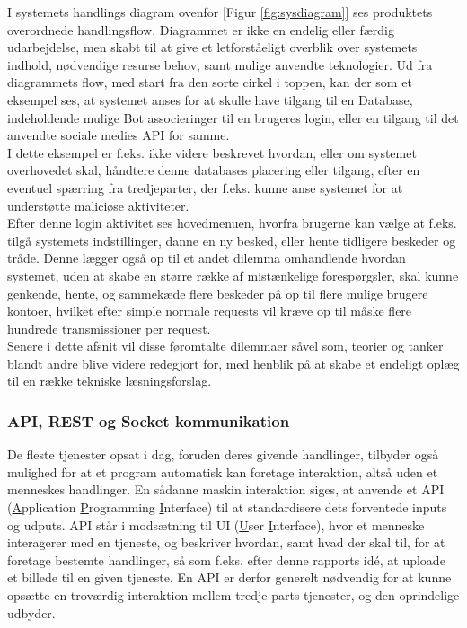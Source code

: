 I systemets handlings diagram ovenfor [Figur \ref{fig:sysdiagram}] ses produktets overordnede handlingsflow. Diagrammet er ikke en endelig eller færdig udarbejdelse, men skabt til at give et letforståeligt overblik over systemets indhold, nødvendige resurse behov, samt mulige anvendte teknologier. Ud fra diagrammets flow, med start fra den sorte cirkel i toppen, kan der som et eksempel ses, at systemet anses for at skulle have tilgang til en Database, indeholdende mulige Bot associeringer til en brugeres login, eller en tilgang til det anvendte sociale medies API for samme.\\
I dette eksempel er f.eks. ikke videre beskrevet hvordan, eller om systemet overhovedet skal, håndtere denne databases placering eller tilgang, efter en eventuel spærring fra tredjeparter, der f.eks. kunne anse systemet for at understøtte maliciøse aktiviteter.\\
Efter denne login aktivitet ses hovedmenuen, hvorfra brugerne kan vælge at f.eks. tilgå systemets indstillinger, danne en ny besked, eller hente tidligere beskeder og tråde. Denne lægger også op til et andet dilemma omhandlende hvordan systemet, uden at skabe en større række af mistænkelige forespørgsler, skal kunne genkende, hente, og sammekæde flere beskeder på op til flere mulige brugere kontoer, hvilket efter simple normale requests vil kræve op til måske flere hundrede transmissioner per request.\\
Senere i dette afsnit vil disse føromtalte dilemmaer såvel som, teorier og tanker blandt andre blive videre redegjort for, med henblik på at skabe et endeligt oplæg til en række tekniske læsningsforslag.


\subsubsection{API, REST og Socket kommunikation}
De fleste tjenester opsat i dag, foruden deres givende handlinger, tilbyder også mulighed for at et program automatisk kan foretage interaktion, altså uden et menneskes handlinger. En sådanne maskin interaktion siges, at anvende et API (\underline{A}pplication \underline{P}rogramming \underline{I}nterface) til at standardisere dets forventede inputs og udputs. 
API står i modsætning til UI (\underline{U}ser \underline{I}nterface), hvor et menneske interagerer med en tjeneste, og beskriver hvordan, samt hvad der skal til, for at foretage bestemte handlinger, så som f.eks. efter denne rapports idé, at uploade et billede til en given tjeneste. En API er derfor generelt nødvendig for at kunne opsætte en troværdig interaktion mellem tredje parts tjenester, og den oprindelige udbyder. \cite{WhatIsAPI}

